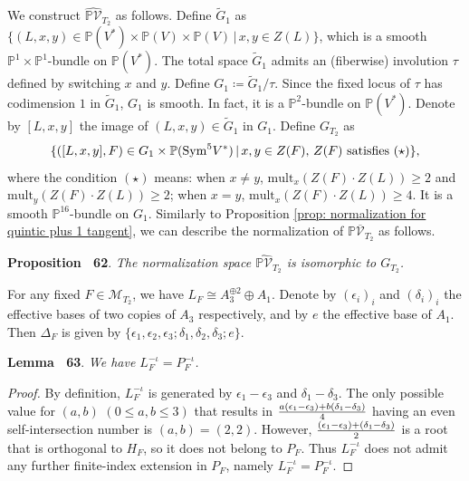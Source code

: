 \documentclass[
]{article}
\begin{document}
We construct \(\widehat{\mathbb{P}\mathcal{V}}_{T_2}\) as follows.
Define \(\widetilde{G}_1\) as
\(\{ (L,x,y)\in\mathbb{P}(V^*)\times\mathbb{P}(V)\times\mathbb{P}(V) \,|\, x,y\in Z(L) \}\),
which is a smooth \(\mathbb{P}^1\times\mathbb{P}^1\)-bundle on
\(\mathbb{P}(V^*)\). The total space \(\widetilde{G}_1\) admits an
(fiberwise) involution \(\tau\) defined by switching \(x\) and \(y\).
Define \(G_1\coloneqq \widetilde{G}_1/\tau\). Since the fixed locus of
\(\tau\) has codimension \(1\) in \(\widetilde{G}_1\), \(G_1\) is
smooth. In fact, it is a \(\mathbb{P}^2\)-bundle on \(\mathbb{P}(V^*)\).
Denote by \([L,x,y]\) the image of \((L,x,y)\in\widetilde{G}_1\) in
\(G_1\). Define \(G_{T_2}\) as
\[\{ ([L,x,y],F)\in G_1\times\mathbb{P}(\mathrm{Sym}^5 V^*) \,|\, x,y\in Z(F),\, Z(F)\textup{ satisfies }(\star) \},\]
where the condition \((\star)\) means: when \(x\ne y\),
\(\mathrm{mult}_x (Z(F)\cdot Z(L))\ge 2\) and
\(\mathrm{mult}_y (Z(F)\cdot Z(L))\ge 2\); when \(x=y\),
\(\mathrm{mult}_x(Z(F)\cdot Z(L))\ge 4\). It is a smooth
\(\mathbb{P}^{16}\)-bundle on \(G_1\). Similarly to Proposition
\ref{prop: normalization for quintic plus 1 tangent}, we can describe
the normalization of \(\mathbb{P}\overline{\mathcal{V}}_{T_2}\) as
follows.

\textbf{Proposition~ 62}. \emph{The normalization space
\(\widehat{\mathbb{P}\mathcal{V}}_{T_2}\) is isomorphic to \(G_{T_2}\).}

For any fixed \(F\in\mathcal{M}_{T_2}\), we have
\(L_F\cong A_3^{\oplus 2}\oplus A_1\). Denote by \((\epsilon_i)_i\) and
\((\delta_i)_i\) the effective bases of two copies of \(A_3\)
respectively, and by \(e\) the effective base of \(A_1\). Then
\(\Delta_F\) is given by
\(\{ \epsilon_1,\epsilon_2,\epsilon_3;\delta_1,\delta_2,\delta_3;e \}\).

\textbf{Lemma~ 63}. \emph{\label{lem: 2 A_3 + 1 A_1: L^-iota = P^-iota}
We have \(L_F^{-\iota}=P_F^{-\iota}\).}

\emph{Proof.} By definition, \(L_F^{-\iota}\) is generated by
\(\epsilon_1-\epsilon_3\) and \(\delta_1-\delta_3\). The only possible
value for \((a,b)\) \((0\le a,b\le 3)\) that results in
\(a(\epsilon_1-\epsilon_3)+b(\delta_1-\delta_3)\over4\) having an even
self-intersection number is \((a,b)=(2,2)\). However,
\((\epsilon_1-\epsilon_3)+(\delta_1-\delta_3)\over2\) is a root that is
orthogonal to \(H_F\), so it does not belong to \(P_F\). Thus
\(L_F^{-\iota}\) does not admit any further finite-index extension in
\(P_F\), namely \(L_F^{-\iota} = P_F^{-\iota}\).~◻
\end{document}
